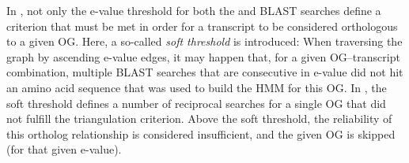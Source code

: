 In \pname, not only the e-value threshold for both the  and
BLAST searches define a criterion that must be met in order for a transcript to
be considered orthologous to a given OG. Here, a so-called \emph{soft threshold}
is introduced: When traversing the graph by ascending  e-value
edges, it may happen that, for a given OG--transcript combination, multiple
BLAST searches that are consecutive in e-value did not hit an amino acid
sequence that was used to build the HMM for this OG. In \pname, the soft
threshold defines a number of reciprocal searches for a single OG that did not
fulfill the triangulation criterion. Above the soft threshold, the reliability
of this ortholog relationship is considered insufficient, and the given OG is
skipped (for that given  e-value). 


